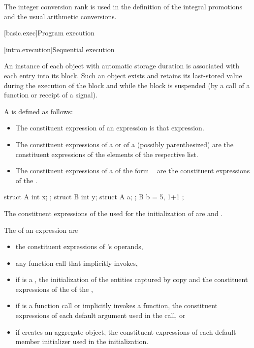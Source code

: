 \begin{note}
The integer conversion rank is used in the definition of the integral
promotions and the usual arithmetic
conversions.
\end{note}%

[basic.exec]{Program execution}

[intro.execution]{Sequential execution}

\pnum
An instance of each object with automatic storage
duration is associated with each entry into its
block. Such an object exists and retains its last-stored value during
the execution of the block and while the block is suspended (by a call
of a function or receipt of a signal).

\pnum
A  is defined as follows:
\begin{itemize}
\item
The constituent expression of an expression is that expression.
\item
The constituent expressions of a  or
of a (possibly parenthesized) 
are the constituent expressions of the elements of the respective list.
\item
The constituent expressions of a 
of the form \tcode{=}~
are the constituent expressions of the .
\end{itemize}
\begin{example}
\begin{codeblock}
struct A { int x; };
struct B { int y; struct A a; };
B b = { 5, { 1+1 } };
\end{codeblock}
The constituent expressions of the 
used for the initialization of  are  and .
\end{example}

\pnum
The  of an expression  are
\begin{itemize}
\item
the constituent expressions of 's operands,
\item
any function call that  implicitly invokes,
\item
if  is a ,
the initialization of the entities captured by copy and
the constituent expressions of the  of the ,
\item
if  is a function call or implicitly invokes a function,
the constituent expressions of each default argument
used in the call, or
\item
if  creates an aggregate object,
the constituent expressions of each default member initializer
used in the initialization.
\end{itemize}

